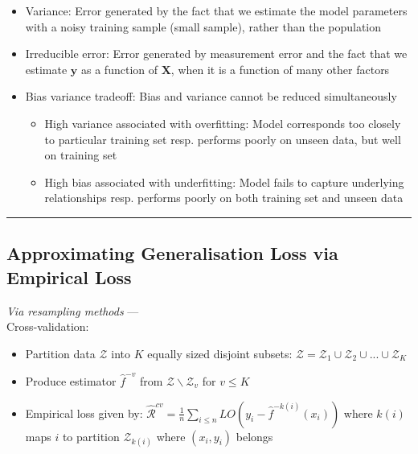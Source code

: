 \begin{itemize}
    \item Variance: Error generated by the fact that we estimate the model parameters with a noisy training sample (small sample), rather than the population
    \item Irreducible error: Error generated by measurement error and the fact that we estimate $\boldsymbol{y}$ as a function of $\boldsymbol{X}$, when it is a function of many other factors
    \item Bias variance tradeoff: Bias and variance cannot be reduced simultaneously
    \begin{itemize}
        \item High variance associated with overfitting: Model corresponds too closely to particular training set resp. performs poorly on unseen data, but well on training set 
        \item High bias associated with underfitting: Model fails to capture underlying relationships resp. performs poorly on both training set and unseen data
    \end{itemize}    
\end{itemize}

{\color{black}\hrule height 0.001mm}

\subsection*{Approximating Generalisation Loss via Empirical Loss}
\emph{Via resampling methods} --- \\
Cross-validation:
\begin{itemize}
    \item Partition data $\mathcal{Z}$ into $K$ equally sized disjoint subsets: $\mathcal{Z} = \mathcal{Z}_1 \cup \mathcal{Z}_2 \cup ... \cup \mathcal{Z}_K$
    \item Produce estimator $\hat{f}^{-v}$ from $\mathcal{Z} \backslash \mathcal{Z}_v$ for $v \leq K$
    \item Empirical loss given by: $\hat{\mathcal{R}}^{cv} = \frac{1}{n} \sum_{i\leq n} LO(y_i - \hat{f}^{-k(i)} (x_i))$ where $k(i)$ maps $i$ to partition $\mathcal{Z}_{k(i)}$ where $(x_i,y_i)$ belongs
\end{itemize}

